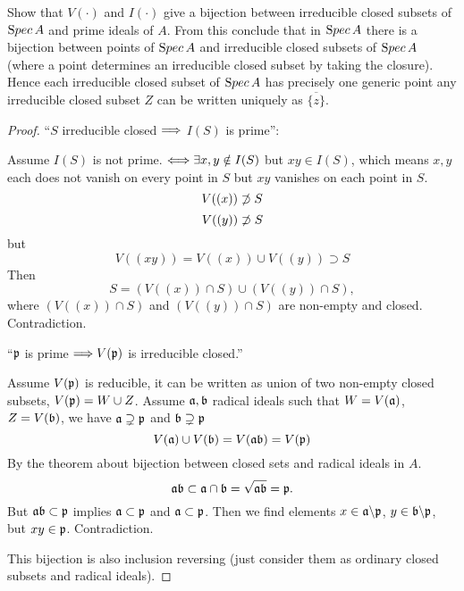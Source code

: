 \documentclass[11pt,fleqn]{book}
\begin{document}
\begin{exr}
Show that $V(\cdot)$ and $I(\cdot)$ give a bijection between irreducible closed subsets of ${\text Spec\,} A$ and prime ideals of $A$. From this conclude that in ${\text Spec\,} A$ there is a bijection between points of ${\text Spec\,} A$ and irreducible closed subsets of ${\text Spec\,} A$ (where a point determines an irreducible closed subset by taking the closure). Hence each irreducible closed subset of ${\text Spec\,} A$ has precisely one generic point  any irreducible closed subset $Z$ can be written uniquely as $\overline{\{z\}}$.
\end{exr}
\begin{proof}
``$S$ irreducible closed $\Longrightarrow$ $I(S)$ is prime'':

Assume $I(S)$ is not prime. $\Longleftrightarrow \exists x,y\notin I(S)$ but $xy\in I(S)$, which means $x,y$ each does not vanish on every point in $S$ but $xy$ vanishes on each point in $S$.
$$
V((x))\not \supset S
$$
$$
V((y))\not \supset S
$$
but 
$$
V((xy))=V((x))\cup V((y))\supset S
$$
Then 
$$
S=(V((x))\cap S)\cup (V((y))\cap S),
$$
where $(V((x))\cap S)$ and $ (V((y))\cap S)$ are non-empty and closed. Contradiction.


``${\mathfrak p}$ is prime $\Longrightarrow V({\mathfrak p})$ is irreducible closed.''

Assume $V({\mathfrak p})$ is reducible, it can be written as union of two non-empty closed subsets, $V({\mathfrak p})=W\cup Z$. Assume ${\mathfrak a},{\mathfrak b}$ radical ideals such that $W=V({\mathfrak a})$, $Z=V({\mathfrak b})$, we have ${\mathfrak a}\supsetneq {\mathfrak p}$ and ${\mathfrak b}\supsetneq {\mathfrak p}$
$$
V({\mathfrak a})\cup V({\mathfrak b})=V({\mathfrak a}{\mathfrak b})=V({\mathfrak p})
$$
By the theorem about bijection between closed sets and radical ideals in $A$.
$$
{\mathfrak a}{\mathfrak b}\subset{\mathfrak a}\cap{\mathfrak b}=\sqrt{{\mathfrak a}{\mathfrak b}}={\mathfrak p}.
$$
But ${\mathfrak a}{\mathfrak b}\subset {\mathfrak p}$ implies ${\mathfrak a}\subset {\mathfrak p}$ and ${\mathfrak a}\subset{\mathfrak p}$. Then we find elements $x\in {\mathfrak a}\backslash{\mathfrak p}$, $y\in {\mathfrak b}\backslash{\mathfrak p}$, but $xy\in{\mathfrak p}$. Contradiction.


This bijection is also inclusion reversing (just consider them as ordinary closed subsets and radical ideals).


\end{proof}
\end{document}
